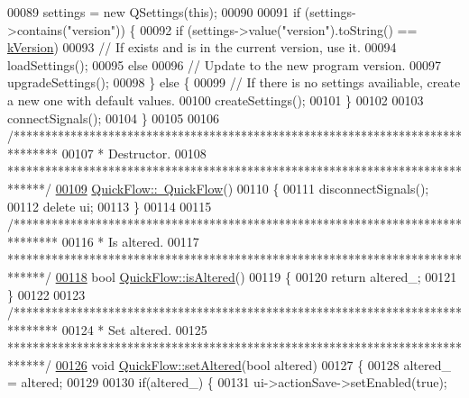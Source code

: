 \begin{DoxyCode}
00089   settings = \textcolor{keyword}{new} QSettings(\textcolor{keyword}{this});
00090 
00091   \textcolor{keywordflow}{if} (settings->contains(\textcolor{stringliteral}{"version"})) \{
00092     \textcolor{keywordflow}{if} (settings->value(\textcolor{stringliteral}{"version"}).toString() == \hyperlink{group___window_gabfc3b1280bdae9a9c046d56b1459ab99}{kVersion})
00093       \textcolor{comment}{// If exists and is in the current version, use it.}
00094       loadSettings();
00095     \textcolor{keywordflow}{else}
00096       \textcolor{comment}{// Update to the new program version.}
00097       upgradeSettings();
00098   \} \textcolor{keywordflow}{else} \{
00099     \textcolor{comment}{// If there is no settings availiable, create a new one with default values.}
00100     createSettings();
00101   \}
00102 
00103   connectSignals();
00104 \}
00105 
00106 \textcolor{comment}{/*******************************************************************************}
00107 \textcolor{comment}{ * Destructor.}
00108 \textcolor{comment}{ ******************************************************************************/}
\hypertarget{quickflow_8cpp_source_l00109}{}\hyperlink{group___window_ga985823a0db64246b3a15eed2f397e0a4}{00109} \hyperlink{group___window_ga985823a0db64246b3a15eed2f397e0a4}{QuickFlow::~QuickFlow}()
00110 \{
00111   disconnectSignals();
00112   \textcolor{keyword}{delete} ui;
00113 \}
00114 
00115 \textcolor{comment}{/*******************************************************************************}
00116 \textcolor{comment}{ * Is altered.}
00117 \textcolor{comment}{ ******************************************************************************/}
\hypertarget{quickflow_8cpp_source_l00118}{}\hyperlink{group___window_ga5d9148467ef65c48419bf020ee107a45}{00118} \textcolor{keywordtype}{bool} \hyperlink{group___window_ga5d9148467ef65c48419bf020ee107a45}{QuickFlow::isAltered}()
00119 \{
00120   \textcolor{keywordflow}{return} altered\_;
00121 \}
00122 
00123 \textcolor{comment}{/*******************************************************************************}
00124 \textcolor{comment}{ * Set altered.}
00125 \textcolor{comment}{ ******************************************************************************/}
\hypertarget{quickflow_8cpp_source_l00126}{}\hyperlink{group___window_ga4b63ea5ca52a9eea14db0a22b5a133f8}{00126} \textcolor{keywordtype}{void} \hyperlink{group___window_ga4b63ea5ca52a9eea14db0a22b5a133f8}{QuickFlow::setAltered}(\textcolor{keywordtype}{bool} altered)
00127 \{
00128   altered\_ = altered;
00129 
00130   \textcolor{keywordflow}{if}(altered\_) \{
00131     ui->actionSave->setEnabled(\textcolor{keyword}{true});

\end{DoxyCode}
